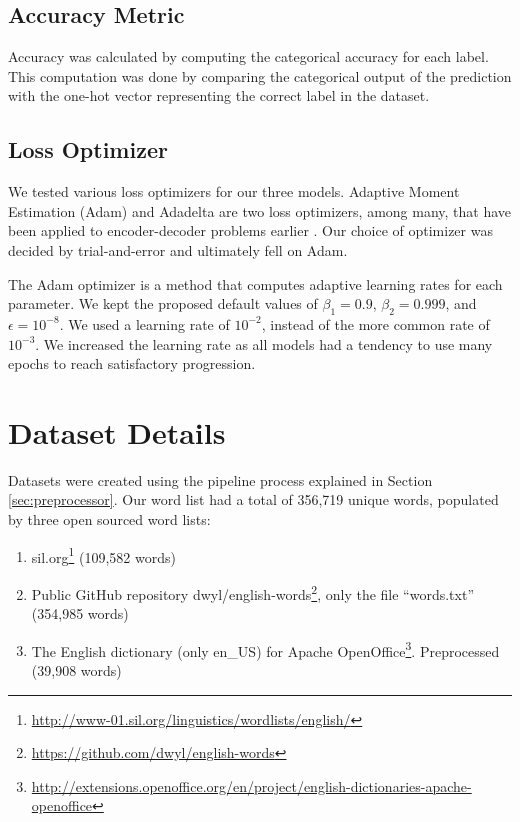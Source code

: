 \subsection{Accuracy Metric}
Accuracy was calculated by computing the categorical accuracy for each label. This computation was done by comparing the categorical output of the prediction with the one-hot vector representing the correct label in the dataset.

\subsection{Loss Optimizer}
We tested various loss optimizers for our three models. Adaptive Moment Estimation (Adam) \citep{kingma2014adam} and Adadelta \citep{zeiler2012adadelta} are two loss optimizers, among many, that have been applied to encoder-decoder problems earlier \citep{cho2014properties, arik2017deep}. Our choice of optimizer was decided by trial-and-error and ultimately fell on Adam.

The Adam optimizer is a method that computes adaptive learning rates for each parameter. We kept the proposed default values of \(\beta_{1} = 0.9\), \(\beta_{2} = 0.999\), and \(\epsilon = 10^{-8}\). We used a learning rate of \(10^{-2}\), instead of the more common rate of \(10^{-3}\). We increased the learning rate as all models had a tendency to use many epochs to reach satisfactory progression.

\section{Dataset Details}
\label{sec:dataset_details}
Datasets were created using the pipeline process explained in Section \ref{sec:preprocessor}. Our word list had a total of 356,719 unique words, populated by three open sourced word lists:

\begin{enumerate}
    \item sil.org\footnote{\url{http://www-01.sil.org/linguistics/wordlists/english/}} (109,582 words)
    \item Public GitHub repository dwyl/english-words\footnote{\url{https://github.com/dwyl/english-words}}, only the file ``words.txt'' (354,985 words) 
    \item The English dictionary (only en\_US) for Apache OpenOffice\footnote{\url{http://extensions.openoffice.org/en/project/english-dictionaries-apache-openoffice}}. Preprocessed (39,908 words)
\end{enumerate}

